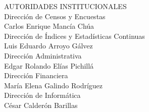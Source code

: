 %
%
%
%

\clearpage

$\ $
\vspace{1cm}

\begin{center}
{\Bold \LARGE AUTORIDADES INSTITUCIONALES}\\[2cm]

{\Bold \large \color{color1!89!black} Dirección de Censos y Encuestas}\\[0.2cm]
Carlos Enrique Mancía Chúa\\[0.8cm]


{\Bold \large \color{color1!89!black} Dirección de Índices y Estadísticas Continuas}\\[0.2cm]
Luis Eduardo Arroyo Gálvez\\[0.8cm]

{\Bold \large \color{color1!89!black} Dirección Administrativa}\\[0.2cm]
Edgar Rolando Elías Pichillá\\[0.8cm]

{\Bold \large \color{color1!89!black} Dirección Financiera}\\[0.2cm]
María Elena Galindo Rodríguez\\[0.8cm]


{\Bold \large \color{color1!89!black} Dirección de Informática}\\[0.2cm]
César Calderón Barillas\\[0.8cm]


\end{center}\cleardoublepage

\clearpage

$\ $
\vspace{1cm}

